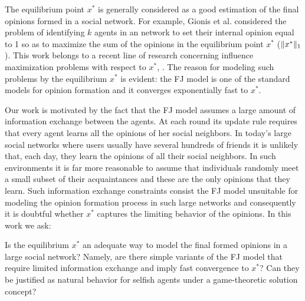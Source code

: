 The equilibrium point $x^*$ is generally considered as a good estimation of the
final opinions formed in a social network. For example, Gionis et al.
\cite{GTT13} considered the problem of identifying $k$ agents in an network to
set their internal opinion equal to 1 so as to maximize the sum of the opinions
in the equilibrium point $x^*$ ($\norm{1}{x^*}$). This work belongs to a recent
line of research concerning influence maximization problems with respect to
$x^*$, \cite{GTT13,AKPT18,MMT17}. The reason for modeling such problems by the
equilibrium $x^*$ is evident: the FJ model is one of the standard models for
opinion formation and it converges exponentially fast to $x^*$.

Our work is motivated by the fact that the FJ model assumes a large amount of
information exchange between the agents. At each round its update rule requires
that every agent learns all the opinions of her social neighbors.  In today's
large social networks where users usually have several hundreds of friends it
is unlikely that, each day, they learn the opinions of all their social neighbors.
In such environments it is far more reasonable to assume that individuals
randomly meet a small subset of their acquaintances and these are the only
opinions that they learn.  Such information exchange constraints consist the FJ
model unsuitable for modeling the opinion formation process in such large
networks and consequently it is doubtful whether $x^*$ captures the limiting
behavior of the opinions. In this work we ask:
%
\begin{question}\label{q:motivation1}
  Is the equilibrium $x^*$ an adequate way to model the final formed opinions
  in a large social network? Namely, are there simple variants of the FJ model
  that require limited information exchange and imply fast convergence to
  $x^*$? Can they be justified as natural behavior for selfish agents under a
  game-theoretic solution concept?
\end{question}

